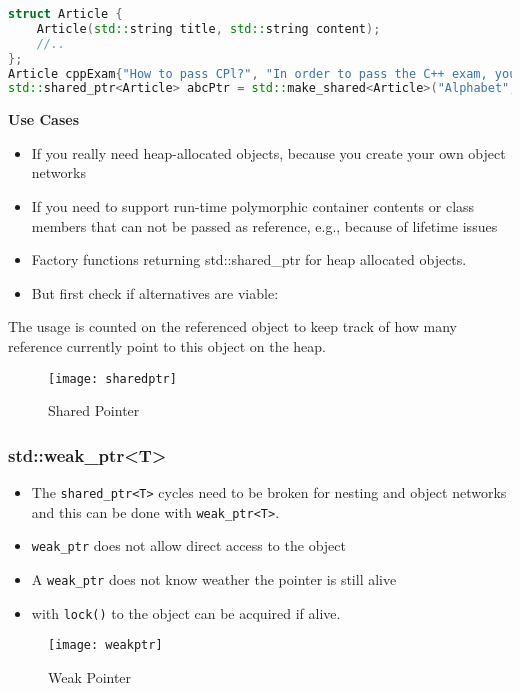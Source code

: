 \begin{lstlisting}[language=C++]
struct Article { 
	Article(std::string title, std::string content);
 	//..
};
Article cppExam{"How to pass CPl?", "In order to pass the C++ exam, you have to..."};
std::shared_ptr<Article> abcPtr = std::make_shared<Article>("Alphabet", "ABCDEFXYZ");
\end{lstlisting}

\textbf{Use Cases}
\begin{itemize}
  \itemsep 0em 
  \item If you really need heap-allocated objects, because you create your own object networks
  \item  If you need to support run-time polymorphic container contents or class members that can not be passed as reference, e.g., because of lifetime issues 
  \item Factory functions returning std::shared\_ptr for heap allocated objects.
  \item  But first check if alternatives are viable:
\end{itemize}

The usage is counted on the referenced object to keep track of how many reference currently point to this object on the heap.

\begin{figure}[h!]
  \center
  \texttt{[image: sharedptr]}
  \caption{Shared Pointer}
\end{figure}


\subsubsection{std::weak\_ptr<T>}
\begin{itemize}
  \itemsep -0.5em 
  \item The \lstinline|shared_ptr<T>| cycles need to be broken for nesting and object networks and this can be done with \lstinline|weak_ptr<T>|.
  \item \lstinline|weak_ptr| does not allow direct access to the object
  \item A \lstinline|weak_ptr| does not know weather the pointer is still alive
  \item with \lstinline|lock()| to the object can be acquired if alive. 
\end{itemize}

\begin{figure}[h!]
  \centering
  \texttt{[image: weakptr]}
  \caption{Weak Pointer}
\end{figure}

